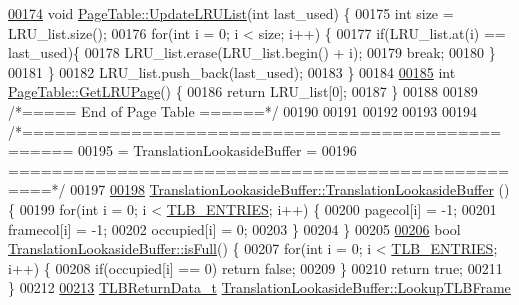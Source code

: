 \begin{DoxyCode}
{{{{{{{{{{{{{{{{{\hypertarget{memory_8cpp_source.tex_l00174}{}\hyperlink{classPageTable_a60e3389362244edc011676ddfc26af13}{00174} \textcolor{keywordtype}{void} \hyperlink{classPageTable_a60e3389362244edc011676ddfc26af13}{PageTable::UpdateLRUList}(\textcolor{keywordtype}{int} last\_used) \{
00175     \textcolor{keywordtype}{int} size = LRU\_list.size();
00176     \textcolor{keywordflow}{for}(\textcolor{keywordtype}{int} i = 0; i < size; i++) \{
00177         \textcolor{keywordflow}{if}(LRU\_list.at(i) == last\_used)\{
00178             LRU\_list.erase(LRU\_list.begin() + i);
00179             \textcolor{keywordflow}{break};
00180         \}
00181     \}
00182     LRU\_list.push\_back(last\_used);
00183 \}
00184 
\hypertarget{memory_8cpp_source.tex_l00185}{}\hyperlink{classPageTable_ab254ab5edbcf8734594b76e165584ff2}{00185} \textcolor{keywordtype}{int} \hyperlink{classPageTable_ab254ab5edbcf8734594b76e165584ff2}{PageTable::GetLRUPage}() \{
00186     \textcolor{keywordflow}{return} LRU\_list[0];
00187 \}
00188 
00189 \textcolor{comment}{/*=====  End of Page Table  ======*/}
00190 
00191 
00192 
00193 
00194 \textcolor{comment}{/*==================================================}
00195 \textcolor{comment}{=            TranslationLookasideBuffer            =}
00196 \textcolor{comment}{==================================================*/}
00197 
\hypertarget{memory_8cpp_source.tex_l00198}{}\hyperlink{classTranslationLookasideBuffer_ad6df9fde44600dedcde0a0d7542e357a}{00198} \hyperlink{classTranslationLookasideBuffer_ad6df9fde44600dedcde0a0d7542e357a}{TranslationLookasideBuffer::TranslationLookasideBuffer}
      () \{
00199     \textcolor{keywordflow}{for}(\textcolor{keywordtype}{int} i = 0; i < \hyperlink{memory_8h_a49009cc208379999b117ed68da61c759}{TLB\_ENTRIES}; i++) \{
00200         pagecol[i] = -1;
00201         framecol[i] = -1;
00202         occupied[i] = 0;
00203     \}
00204 \}
00205 
\hypertarget{memory_8cpp_source.tex_l00206}{}\hyperlink{classTranslationLookasideBuffer_a6416b56aa9b1593b602281f3a81af091}{00206} \textcolor{keywordtype}{bool} \hyperlink{classTranslationLookasideBuffer_a6416b56aa9b1593b602281f3a81af091}{TranslationLookasideBuffer::isFull}() \{
00207     \textcolor{keywordflow}{for}(\textcolor{keywordtype}{int} i = 0; i < \hyperlink{memory_8h_a49009cc208379999b117ed68da61c759}{TLB\_ENTRIES}; i++) \{
00208         \textcolor{keywordflow}{if}(occupied[i] == 0) \textcolor{keywordflow}{return} \textcolor{keyword}{false};
00209     \}
00210     \textcolor{keywordflow}{return} \textcolor{keyword}{true};
00211 \}
00212 
\hypertarget{memory_8cpp_source.tex_l00213}{}\hyperlink{classTranslationLookasideBuffer_a411659ccd7cb5b72a165bc69cc353e0a}{00213} \hyperlink{structTLBReturnData__t}{TLBReturnData\_t} \hyperlink{classTranslationLookasideBuffer_a411659ccd7cb5b72a165bc69cc353e0a}{TranslationLookasideBuffer::LookupTLBFrame}
}}}}}}}}}}}}}}}}}
\end{DoxyCode}

